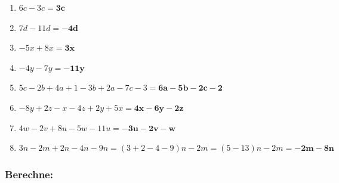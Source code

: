 \documentclass[a4paper,10pt]{article} %
\begin{document}
\begin{enumerate}[label=\alph*)]

  \item \(6c - 3c =
    \mathbf{3c}\) %

  \item \(7d - 11d =
    \mathbf{-4d}\) %

  \item \(-5x + 8x =
    \mathbf{3x}\) %

  \item \(-4y - 7y =
    \mathbf{-11y}\) %

  \item \(5c - 2b + 4a + 1 - 3b + 2a - 7c - 3 =
    \mathbf{6a - 5b - 2c -2}\) %

  \item \(-8y + 2z - x - 4z + 2y + 5x =
    \mathbf{4x - 6y - 2z}\) %

  \item \(4w - 2v + 8u - 5w - 11u =
    \mathbf{-3u - 2v - w}\) %

  \item \(3n - 2m + 2n - 4n - 9n =
    (3 + 2 - 4 - 9)n - 2m = (5 - 13)n - 2m =
    \mathbf{-2m - 8n}\) %

\end{enumerate}

\subsubsection{Berechne:} %
\end{document}
